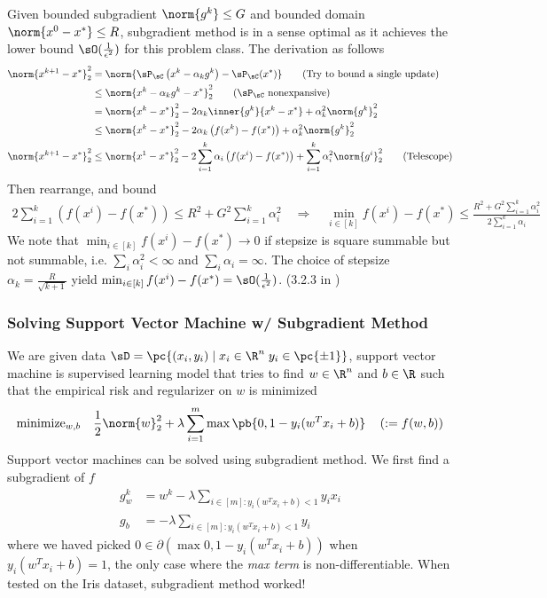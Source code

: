 \documentclass[../summary.tex]{subfiles}
\begin{document}
Given bounded subgradient $\norm{g^k}\leq G$ and bounded domain $\norm{x^0 - x^*} \leq R$, subgradient method is in a sense optimal as it achieves the lower bound $\sO(\frac{1}{\epsilon^2})$ for this problem class. The derivation as follows
\begin{align*}
    \norm{x^{k+1} - x^*}_2^2
        &= \norm{\sP_{\sC}\left(x^k - \alpha_k g^k\right) -  \sP_{\sC}(x^*)} 
            \tag{Try to bound a single update} \\
        &\leq \norm{x^k - \alpha_k g^k - x^*}_2^2
                \tag{$\sP_{\sC}$ nonexpansive} \\ 
        &= \norm{x^k-x^*}_2^2 - 2\alpha_k \inner{g^k}{x^k-x^*} + \alpha_k^2 \norm{g^k}_2^2 \\
        &\leq \norm{x^k-x^*}_2^2 - 2\alpha_k \left( f(x^k) - f(x^*) \right) + \alpha_k^2 \norm{g^k}_2^2 \\
    \norm{x^{k+1} - x^*}_2^2
        &\leq \norm{x^1 - x^*}_2^2 - 2\sum_{i=1}^{k} \alpha_i\left(f(x^i) - f(x^*)\right) + \sum_{i=1}^k \alpha_i^2 \norm{g^i}_2^2
            \tag{Telescope} 
\end{align*} 
Then rearrange, and bound 
\begin{align*} 
    2\sum_{i=1}^k \left(f(x^i) - f(x^*)\right)
        \leq R^2 + G^2 \sum_{i=1}^k \alpha_i^2 \quad\Rightarrow\quad
    \min_{i\in[k]} f(x^i) - f(x^*) 
        \leq \frac{R^2 + G^2\sum_{i=1}^k \alpha_i^2}{2\sum_{i=1}^k \alpha_i}
\end{align*} 
We note that $\min_{i\in[k]} f(x^i) - f(x^*) \to 0$ if stepsize is square summable but not summable, i.e. $\sum_i \alpha_i^2 < \infty$ and $\sum_i \alpha_i = \infty$. The choice of stepsize $\alpha_k = \frac{R}{\sqrt{k+1}}$ yield $\min_{i\in[k]} f(x^i) - f(x^*) = \sO(\frac{1}{\epsilon^2})$. (3.2.3 in \cite{nesterovIntroductoryLecturesConvex2004})
 
 
\subsubsection{Solving Support Vector Machine w/ Subgradient Method}

We are given data $\sD = \pc{(x_i,y_i) \mid x_i\in\R^n \; y_i \in \pc{\pm 1}}$, support vector machine is supervised learning model that tries to find $w\in\R^n$ and $b\in\R$ such that the empirical risk and regularizer on $w$ is minimized
\begin{align*}
    \text{minimize}_{w,b} \quad
        \frac{1}{2} \norm{w}_2^2 + \lambda \sum_{i=1}^m \max\pb{0, 1 - y_i(w^Tx_i + b)} 
        \quad \left( := f(w,b) \right)
\end{align*}
Support vector machines can be solved using subgradient method. We first find a subgradient of $f$
\begin{align*}
    g_w^k
        &= w^k - \lambda \sum_{i\in[m]: y_i(w^Tx_i + b) < 1 } y_i x_i \\
    g_b
        &= -\lambda \sum_{i\in[m]: y_i(w^Tx_i + b) < 1 } y_i
\end{align*}
where we haved picked $0\in\partial (\max{0, 1- y_i(w^Tx_i + b)})$ when $y_i(w^Tx_i + b) = 1$, the only case where the \textit{max term} is non-differentiable. When tested on the Iris dataset, subgradient method worked!
\end{document}
